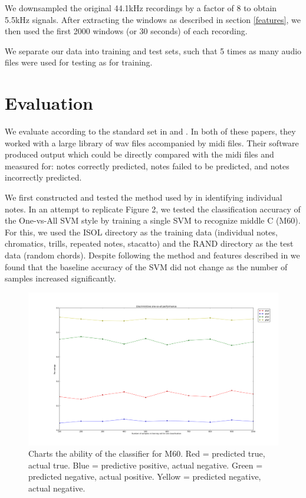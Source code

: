 \documentclass{article}
\begin{document}
We downsampled the original 44.1kHz recordings by a factor of 8 to
obtain 5.5kHz signals. After extracting the windows as described in section
\ref{features}, we then used the first 2000 windows (or 30 seconds) of each
recording.

We separate our data into training and test sets, such that 5 times as
many audio files were used for testing as for training.%

\section{Evaluation}
We evaluate according to the standard set in \cite{poliner2006discriminative} and \cite{bock2012polyphonic}.
In both of these papers, they worked with a large library of wav files accompanied by midi files. Their software produced
output which could be directly compared with the midi files and measured for: notes correctly predicted, notes failed to be predicted, and notes incorrectly predicted.

We first constructed and tested the method used by \cite{poliner2006discriminative} in identifying individual notes. In an attempt to replicate Figure 2, we tested the classification accuracy of the One-vs-All SVM style by training a single SVM to recognize middle C (M60). For this, we used the ISOL directory as the training data (individual notes, chromatics, trills, repeated notes, stacatto) and the RAND directory as the test data (random chords). Despite following the method and features described in \cite{poliner2006discriminative} we found that the baseline accuracy of the SVM did not change as the number of samples increased significantly.

\begin{figure}
\includegraphics[scale=.15]{discriminitive.png}
\caption{Charts the ability of the classifier for M60. Red = predicted true, actual true. Blue = predictive positive, actual negative. Green = predicted negative, actual positive. Yellow = predicted negative, actual negative.} 
\end{figure}
\end{document}
